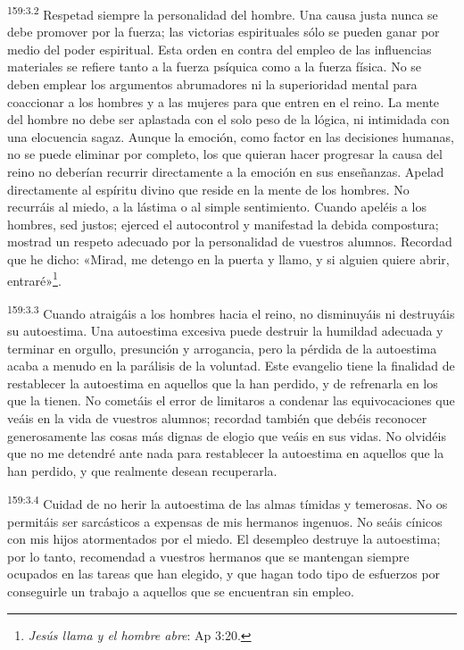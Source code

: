 \par 
\textsuperscript{159:3.2} Respetad siempre la personalidad del hombre. Una causa justa nunca se debe promover por la fuerza; las victorias espirituales sólo se pueden ganar por medio del poder espiritual. Esta orden en contra del empleo de las influencias materiales se refiere tanto a la fuerza psíquica como a la fuerza física. No se deben emplear los argumentos abrumadores ni la superioridad mental para coaccionar a los hombres y a las mujeres para que entren en el reino. La mente del hombre no debe ser aplastada con el solo peso de la lógica, ni intimidada con una elocuencia sagaz. Aunque la emoción, como factor en las decisiones humanas, no se puede eliminar por completo, los que quieran hacer progresar la causa del reino no deberían recurrir directamente a la emoción en sus enseñanzas. Apelad directamente al espíritu divino que reside en la mente de los hombres. No recurráis al miedo, a la lástima o al simple sentimiento. Cuando apeléis a los hombres, sed justos; ejerced el autocontrol y manifestad la debida compostura; mostrad un respeto adecuado por la personalidad de vuestros alumnos. Recordad que he dicho: «Mirad, me detengo en la puerta y llamo, y si alguien quiere abrir, entraré»\footnote{\textit{Jesús llama y el hombre abre}: Ap 3:20.}.

\par 
\textsuperscript{159:3.3} Cuando atraigáis a los hombres hacia el reino, no disminuyáis ni destruyáis su autoestima. Una autoestima excesiva puede destruir la humildad adecuada y terminar en orgullo, presunción y arrogancia, pero la pérdida de la autoestima acaba a menudo en la parálisis de la voluntad. Este evangelio tiene la finalidad de restablecer la autoestima en aquellos que la han perdido, y de refrenarla en los que la tienen. No cometáis el error de limitaros a condenar las equivocaciones que veáis en la vida de vuestros alumnos; recordad también que debéis reconocer generosamente las cosas más dignas de elogio que veáis en sus vidas. No olvidéis que no me detendré ante nada para restablecer la autoestima en aquellos que la han perdido, y que realmente desean recuperarla.

\par 
\textsuperscript{159:3.4} Cuidad de no herir la autoestima de las almas tímidas y temerosas. No os permitáis ser sarcásticos a expensas de mis hermanos ingenuos. No seáis cínicos con mis hijos atormentados por el miedo. El desempleo destruye la autoestima; por lo tanto, recomendad a vuestros hermanos que se mantengan siempre ocupados en las tareas que han elegido, y que hagan todo tipo de esfuerzos por conseguirle un trabajo a aquellos que se encuentran sin empleo.

